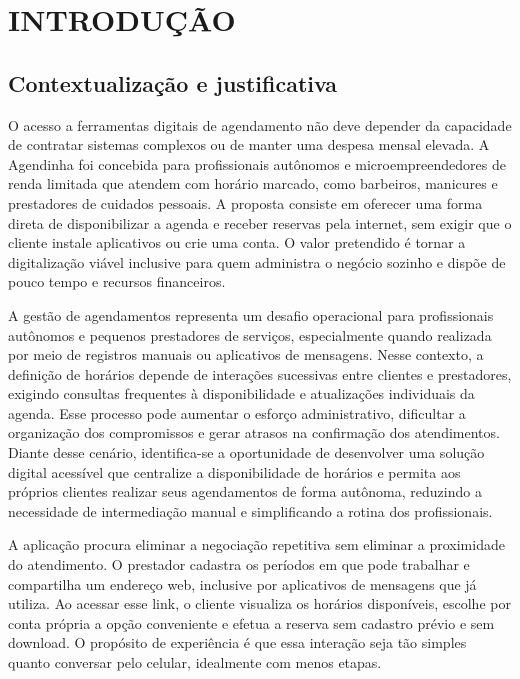 \section{INTRODUÇÃO}

\subsection{Contextualização e justificativa}

O acesso a ferramentas digitais de agendamento não deve depender da capacidade de contratar sistemas complexos ou de manter uma despesa mensal elevada. A Agendinha foi concebida para profissionais autônomos e microempreendedores de renda limitada que atendem com horário marcado, como barbeiros, manicures e prestadores de cuidados pessoais. A proposta consiste em oferecer uma forma direta de disponibilizar a agenda e receber reservas pela internet, sem exigir que o cliente instale aplicativos ou crie uma conta. O valor pretendido é tornar a digitalização viável inclusive para quem administra o negócio sozinho e dispõe de pouco tempo e recursos financeiros.

A gestão de agendamentos representa um desafio operacional para profissionais autônomos e pequenos prestadores de serviços, especialmente quando realizada por meio de registros manuais ou aplicativos de mensagens. Nesse contexto, a definição de horários depende de interações sucessivas entre clientes e prestadores, exigindo consultas frequentes à disponibilidade e atualizações individuais da agenda. Esse processo pode aumentar o esforço administrativo, dificultar a organização dos compromissos e gerar atrasos na confirmação dos atendimentos. Diante desse cenário, identifica-se a oportunidade de desenvolver uma solução digital acessível que centralize a disponibilidade de horários e permita aos próprios clientes realizar seus agendamentos de forma autônoma, reduzindo a necessidade de intermediação manual e simplificando a rotina dos profissionais.

A aplicação procura eliminar a negociação repetitiva sem eliminar a proximidade do atendimento. O prestador cadastra os períodos em que pode trabalhar e compartilha um endereço web, inclusive por aplicativos de mensagens que já utiliza. Ao acessar esse link, o cliente visualiza os horários disponíveis, escolhe por conta própria a opção conveniente e efetua a reserva sem cadastro prévio e sem download. O propósito de experiência é que essa interação seja tão simples quanto conversar pelo celular, idealmente com menos etapas.

